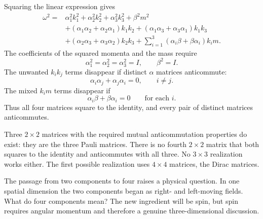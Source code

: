 Squaring the linear expression gives
\begin{align}
\omega^2
={}&
\alpha_1^2k_1^2+\alpha_2^2k_2^2+\alpha_3^2k_3^2+\beta^2m^2
\nonumber\\
&+(\alpha_1\alpha_2+\alpha_2\alpha_1)k_1k_2
+(\alpha_1\alpha_3+\alpha_3\alpha_1)k_1k_3
\nonumber\\
&+(\alpha_2\alpha_3+\alpha_3\alpha_2)k_2k_3
+\sum_{i=1}^{3}(\alpha_i\beta+\beta\alpha_i)k_i m.
\end{align}
The coefficients of the squared momenta and the mass require
\begin{equation}
\alpha_1^2=\alpha_2^2=\alpha_3^2=I,
\qquad
\beta^2=I.
\end{equation}
The unwanted \(k_i k_j\) terms disappear if distinct \(\alpha\) matrices anticommute:
\begin{equation}
\alpha_i\alpha_j+\alpha_j\alpha_i=0,
\qquad i\neq j.
\end{equation}
The mixed \(k_i m\) terms disappear if
\begin{equation}
\alpha_i\beta+\beta\alpha_i=0
\qquad
\text{for each }i.
\end{equation}
Thus all four matrices square to the identity, and every pair of distinct matrices anticommutes.

Three \(2\times2\) matrices with the required mutual anticommutation properties do exist: they are the three Pauli matrices. There is no fourth \(2\times2\) matrix that both squares to the identity and anticommutes with all three. No \(3\times3\) realization works either. The first possible realization uses \(4\times4\) matrices, the Dirac matrices.

The passage from two components to four raises a physical question. In one spatial dimension the two components began as right- and left-moving fields. What do four components mean? The new ingredient will be spin, but spin requires angular momentum and therefore a genuine three-dimensional discussion.

